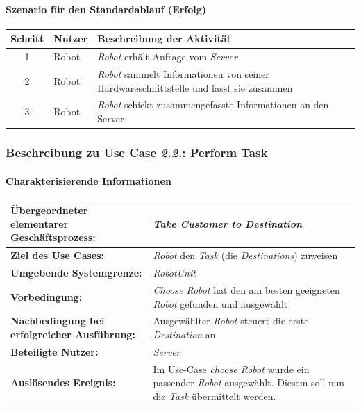 				\paragraph*{Szenario für den Standardablauf (Erfolg)}

				\begin{table}[H]
					\centering
					\begin{tabularx}{\textwidth}{|c|p{2cm}|X|}
						\hline
						Schritt & Nutzer & Beschreibung der Aktivität \\ \hline
						1 & Robot & \emph{Robot} erhält Anfrage vom \emph{Server} \\
						2 & Robot & \emph{Robot} sammelt Informationen von seiner Hardwareschnittstelle und fasst sie zusammen \\
						3 & Robot & \emph{Robot} schickt zusammengefasste Informationen an den Server \\
						\hline
					\end{tabularx}
				\end{table}


				\pagebreak

			\subsubsection{Beschreibung zu Use Case \emph{2.2.}: Perform Task}

				\paragraph*{Charakterisierende Informationen}

				\begin{table}[H]
					\centering
					\begin{tabularx}{\textwidth}{|p{5cm}|X|}
						\hline
						\textbf{Übergeordneter elementarer Geschäftsprozess:} & \emph{Take Customer to Destination} \\ \hline
						\textbf{Ziel des Use Cases:} & \emph{Robot} den \emph{Task} (die \emph{Destinations}) zuweisen\\ \hline
						\textbf{Umgebende Systemgrenze:} & \emph{RobotUnit} \\ \hline
						\textbf{Vorbedingung:} & \textit{ \glqq Choose Robot \grqq } hat den am besten geeigneten \emph{Robot} gefunden und ausgewählt\\ \hline
						\textbf{Nachbedingung bei erfolgreicher Ausführung:} & Ausgewählter \emph{Robot} steuert die erste \emph{Destination} an\\ \hline
						\textbf{Beteiligte Nutzer:} & \emph{Server} \\ \hline
						\textbf{Auslösendes Ereignis:} & Im Use-Case \textit{ \glqq choose Robot \grqq } wurde ein passender \emph{Robot} ausgewählt. Diesem soll nun die \emph{Task} übermittelt werden. \\
						\hline
					\end{tabularx}
				\end{table}

